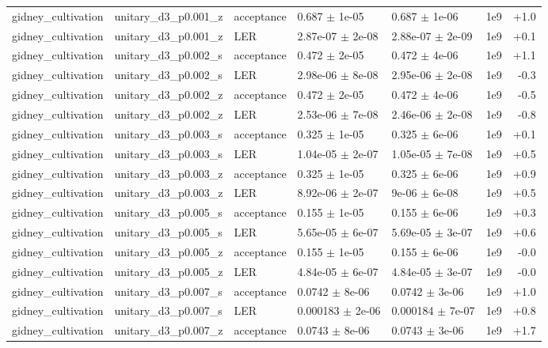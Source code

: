\documentclass[10pt]{article}
\begin{document}
{\begin{longtable}{l l l l l r r}
gidney\_cultivation & unitary\_d3\_p0.001\_z & acceptance & 0.687 $\pm$ 1e-05 & 0.687 $\pm$ 1e-06 & 1e9 & +1.0 \\
gidney\_cultivation & unitary\_d3\_p0.001\_z & LER & 2.87e-07 $\pm$ 2e-08 & 2.88e-07 $\pm$ 2e-09 & 1e9 & +0.1 \\
gidney\_cultivation & unitary\_d3\_p0.002\_s & acceptance & 0.472 $\pm$ 2e-05 & 0.472 $\pm$ 4e-06 & 1e9 & +1.1 \\
gidney\_cultivation & unitary\_d3\_p0.002\_s & LER & 2.98e-06 $\pm$ 8e-08 & 2.95e-06 $\pm$ 2e-08 & 1e9 & -0.3 \\
gidney\_cultivation & unitary\_d3\_p0.002\_z & acceptance & 0.472 $\pm$ 2e-05 & 0.472 $\pm$ 4e-06 & 1e9 & -0.5 \\
gidney\_cultivation & unitary\_d3\_p0.002\_z & LER & 2.53e-06 $\pm$ 7e-08 & 2.46e-06 $\pm$ 2e-08 & 1e9 & -0.8 \\
gidney\_cultivation & unitary\_d3\_p0.003\_s & acceptance & 0.325 $\pm$ 1e-05 & 0.325 $\pm$ 6e-06 & 1e9 & +0.1 \\
gidney\_cultivation & unitary\_d3\_p0.003\_s & LER & 1.04e-05 $\pm$ 2e-07 & 1.05e-05 $\pm$ 7e-08 & 1e9 & +0.5 \\
gidney\_cultivation & unitary\_d3\_p0.003\_z & acceptance & 0.325 $\pm$ 1e-05 & 0.325 $\pm$ 6e-06 & 1e9 & +0.9 \\
gidney\_cultivation & unitary\_d3\_p0.003\_z & LER & 8.92e-06 $\pm$ 2e-07 & 9e-06 $\pm$ 6e-08 & 1e9 & +0.5 \\
gidney\_cultivation & unitary\_d3\_p0.005\_s & acceptance & 0.155 $\pm$ 1e-05 & 0.155 $\pm$ 6e-06 & 1e9 & +0.3 \\
gidney\_cultivation & unitary\_d3\_p0.005\_s & LER & 5.65e-05 $\pm$ 6e-07 & 5.69e-05 $\pm$ 3e-07 & 1e9 & +0.6 \\
gidney\_cultivation & unitary\_d3\_p0.005\_z & acceptance & 0.155 $\pm$ 1e-05 & 0.155 $\pm$ 6e-06 & 1e9 & -0.0 \\
gidney\_cultivation & unitary\_d3\_p0.005\_z & LER & 4.84e-05 $\pm$ 6e-07 & 4.84e-05 $\pm$ 3e-07 & 1e9 & -0.0 \\
gidney\_cultivation & unitary\_d3\_p0.007\_s & acceptance & 0.0742 $\pm$ 8e-06 & 0.0742 $\pm$ 3e-06 & 1e9 & +1.0 \\
gidney\_cultivation & unitary\_d3\_p0.007\_s & LER & 0.000183 $\pm$ 2e-06 & 0.000184 $\pm$ 7e-07 & 1e9 & +0.8 \\
gidney\_cultivation & unitary\_d3\_p0.007\_z & acceptance & 0.0743 $\pm$ 8e-06 & 0.0743 $\pm$ 3e-06 & 1e9 & +1.7 \\

\end{longtable}}
\end{document}
